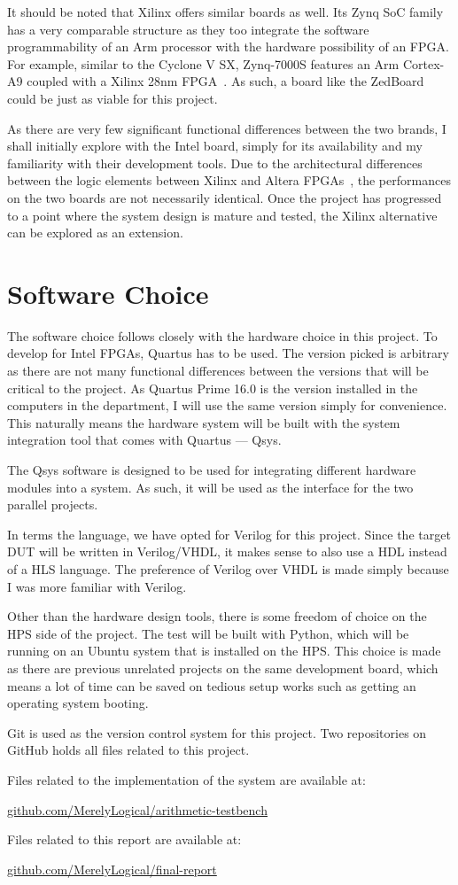 It should be noted that Xilinx offers similar boards as well.
Its Zynq SoC family has a very comparable structure as they too integrate the software programmability of an Arm processor with the hardware possibility of an FPGA.
For example, similar to the Cyclone V SX, Zynq-7000S features an Arm Cortex-A9
coupled with a Xilinx 28nm FPGA~\cite{Xilinx1}.
As such, a board like the ZedBoard~\cite{Xilinx2} could be just as viable for this project.

As there are very few significant functional differences between the two brands, I shall initially explore with the Intel board, simply for its availability and my familiarity with their development tools.
Due to the architectural differences between the logic elements between Xilinx and Altera FPGAs~\cite{Scekic1}, the performances on the two boards are not necessarily identical.
Once the project has progressed to a point where the system design is mature and tested, the Xilinx alternative can be explored as an extension.

\section{Software Choice}
The software choice follows closely with the hardware choice in this project.
To develop for Intel FPGAs, Quartus has to be used.
The version picked is arbitrary as there are not many functional differences between the versions that will be critical to the project.
As Quartus Prime 16.0 is the version installed in the computers in the department, I will use the same version simply for convenience.
This naturally means the hardware system will be built with the system integration tool that comes with Quartus --- Qsys.

The Qsys software is designed to be used for integrating different hardware modules into a system.
As such, it will be used as the interface for the two parallel projects.

In terms the language, we have opted for Verilog for this project.
Since the target DUT will be written in Verilog/VHDL, it makes sense to also use a HDL instead of a HLS language.
The preference of Verilog over VHDL is made simply because I was more familiar with Verilog.

Other than the hardware design tools, there is some freedom of choice on the HPS side of the project.
The test will be built with Python, which will be running on an Ubuntu system that is installed on the HPS.
This choice is made as there are previous unrelated projects on the same development board, which means a lot of time can be saved on tedious setup works such as getting an operating system booting.

Git is used as the version control system for this project.
Two repositories on GitHub holds all files related to this project.

Files related to the implementation of the system are available at:

\indent\indent\url{github.com/MerelyLogical/arithmetic-testbench}

Files related to this report are available at:

\indent\indent\url{github.com/MerelyLogical/final-report}